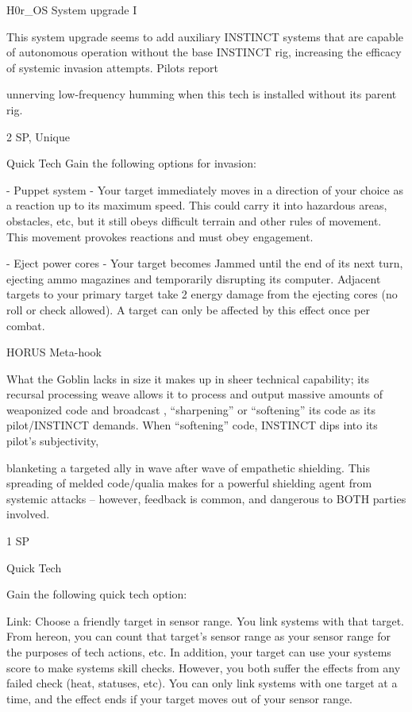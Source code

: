 H0r\_OS System upgrade I  

This system upgrade seems to add auxiliary INSTINCT systems that are capable of autonomous operation  
without the base INSTINCT rig, increasing the efficacy of systemic invasion attempts. Pilots report  

unnerving low-frequency humming when this tech is installed without its parent rig.  

2 SP, Unique  

Quick Tech  
Gain the following options for invasion:
 
     -   Puppet system - Your target immediately moves in a direction of your choice as a  
         reaction up to its maximum speed. This could carry it into hazardous areas, obstacles,  
         etc, but it still obeys difficult terrain and other rules of movement. This movement  
         provokes reactions and must obey engagement.
 
     -   Eject power cores - Your target becomes Jammed until the end of its next turn, ejecting  
         ammo magazines and temporarily disrupting its computer. Adjacent targets to your  
         primary target take 2 energy damage from the ejecting cores (no roll or check allowed). A  
         target can only be affected by this effect once per combat.
 

HORUS Meta-hook  

                                                                                                                   


What the Goblin lacks in size it makes up in sheer technical capability; its recursal processing weave allows  
it to process and output massive amounts of weaponized code and broadcast , “sharpening” or “softening”  
its code as its pilot/INSTINCT demands. When “softening” code, INSTINCT dips into its pilot’s subjectivity,  

blanketing a targeted ally in wave after wave of empathetic shielding. This spreading of melded code/qualia  
makes for a powerful shielding agent from systemic attacks -- however, feedback is common, and  
dangerous to BOTH parties involved.   

1 SP
 
Quick Tech
 
Gain the following quick tech option:
 
         Link: Choose a friendly target in sensor range. You link systems with that target. From  
         hereon, you can count that target’s sensor range as your sensor range for the purposes of  
        tech actions, etc. In addition, your target can use your systems score to make systems  
        skill checks. However, you both suffer the effects from any failed check (heat, statuses,  
        etc). You can only link systems with one target at a time, and the effect ends if your target  
         moves out of your sensor range.
 

